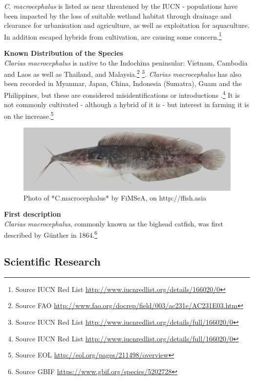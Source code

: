 \documentclass[openany]{book}
\let\rmarkdownfootnote\footnote%
\def\footnote{\protect\rmarkdownfootnote}
\theoremstyle{definition}
\theoremstyle{definition}
\theoremstyle{definition}
\theoremstyle{remark}
\begin{document}
\emph{C. macrocephalus} is listed as near threatened by the IUCN -
populations have been impacted by the loss of suitable wetland habitat
through drainage and clearance for urbanisation and agriculture, as well
as exploitation for aquaculture. In addition escaped hybrids from
cultivation, are causing some concern.\footnote{Source IUCN Red List
  \url{http://www.iucnredlist.org/details/166020/0}}

\textbf{Known Distribution of the Species}\\
\emph{Clarias macrocephalus} is native to the Indochina peninsular:
Vietnam, Cambodia and Laos as well as Thailand, and Malaysia.\footnote{Source
  FAO \url{http://www.fao.org/docrep/field/003/ac231e/AC231E03.htm}}
\footnote{Source IUCN Red List
  \url{http://www.iucnredlist.org/details/full/166020/0}}. \emph{Clarias
macrocephalus} has also been recorded in Myanmar, Japan, China,
Indonesia (Sumatra), Guam and the Philippines, but these are considered
misidentifications or introductions .\footnote{Source IUCN Red List
  \url{http://www.iucnredlist.org/details/full/166020/0}} It is not
commonly cultivated - although a hybrid of it is - but interest in
farming it is on the increase.\footnote{Source EOL
  \url{http://eol.org/pages/211498/overview}}

\begin{figure}

{\centering \includegraphics[width=14.22in]{images_species/152_Clarias_macrocephalus_CTU-P00116} 

}

\caption{Photo of *C.macrocephalus* by FiMSeA, on http://ffish.asia}\label{fig:unnamed-chunk-2}
\end{figure}

\textbf{First description}\\
\emph{Clarias macrocephalus}, commonly known as the bighead catfish, was
first described by Günther in 1864.\footnote{Source GBIF
  \url{https://www.gbif.org/species/5202728}}

\hypertarget{scientific-research}{%
\subsection{Scientific Research}\label{scientific-research}}
\end{document}
